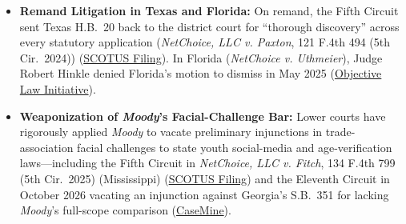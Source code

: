 \documentclass[12pt]{article}
\begin{document}
\begin{itemize}

\item \textbf{Remand Litigation in Texas and Florida:} On remand, the Fifth Circuit sent Texas H.B.~20 back to the district court for ``thorough discovery'' across every statutory application (\textit{NetChoice, LLC v. Paxton}, 121 F.4th 494 (5th Cir.~2024)) (\href{https://www.supremecourt.gov/DocketPDF/25/25A97/368437/20250730143535035_No.%2025A97%20Response%20to%20Application.pdf}{SCOTUS Filing}). In Florida (\textit{NetChoice v. Uthmeier}), Judge Robert Hinkle denied Florida's motion to dismiss in May 2025 (\href{https://objectivelaw.org/issue-opportunities/moody-netchoice/}{Objective Law Initiative}).
    \item \textbf{Weaponization of \textit{Moody}'s Facial-Challenge Bar:} Lower courts have rigorously applied \textit{Moody} to vacate preliminary injunctions in trade-association facial challenges to state youth social-media and age-verification laws---including the Fifth Circuit in \textit{NetChoice, LLC v. Fitch}, 134 F.4th 799 (5th Cir.~2025) (Mississippi) (\href{https://www.supremecourt.gov/DocketPDF/25/25A97/368437/20250730143535035_No.%2025A97%20Response%20to%20Application.pdf}{SCOTUS Filing}) and the Eleventh Circuit in October 2026 vacating an injunction against Georgia's S.B.~351 for lacking \textit{Moody}'s full-scope comparison (\href{https://www.casemine.com/commentary/us/facial-challenges-to-social-media-age-restrictions-require-full-scope-analysis-under-moody/view}{CaseMine}).

\end{itemize}
\end{document}
